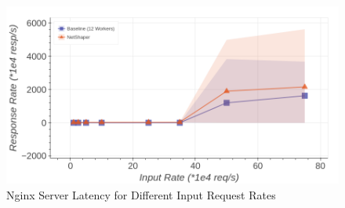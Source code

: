 \begin{figure}[!htb]
    \centering
    \includegraphics[width=\columnwidth]{figures/netshaper/evaluation/http_reqs_latency.png}
    \caption{Nginx Server Latency for Different Input Request Rates}
    \label{fig:netshaper-eval-http-reqs-latency}
\end{figure}